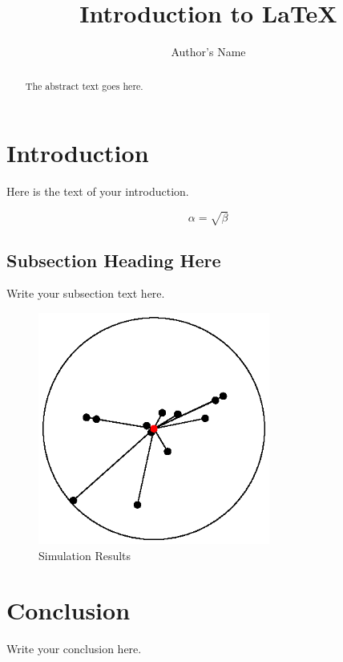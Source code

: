 \documentclass[a4paper]{article}
\begin{document}
\title{Introduction to \LaTeX{}}
\author{Author's Name}

\maketitle

\begin{abstract}
The abstract text goes here.
\end{abstract}

\section{Introduction}
Here is the text of your introduction.

\begin{equation}
    \label{simple_equation}
    \alpha = \sqrt{ \beta }
\end{equation}

\subsection{Subsection Heading Here}
Write your subsection text here.

\begin{figure}
    \centering
    \includegraphics[width=3.0in]{fig-compactness.eps}
    \caption{Simulation Results}
    \label{simulationfigure}
\end{figure}

\section{Conclusion}
Write your conclusion here.
\end{document}
